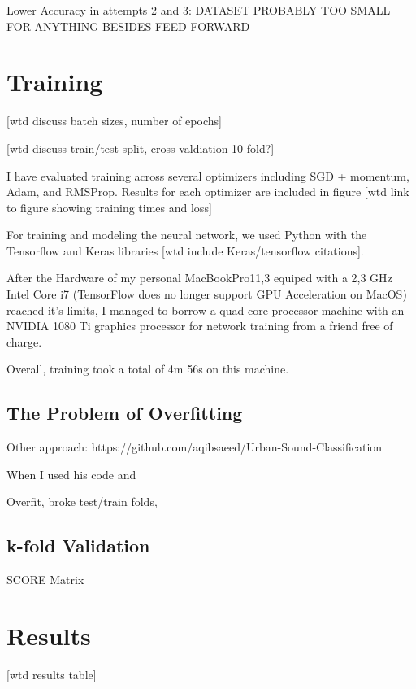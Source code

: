 Lower Accuracy in attempts 2 and 3: DATASET PROBABLY TOO SMALL FOR ANYTHING BESIDES FEED FORWARD


\newpage

\section{Training}

[wtd discuss batch sizes, number of epochs]

[wtd discuss train/test split, cross valdiation 10 fold?]

I have evaluated training across several optimizers including SGD + momentum, Adam, and RMSProp.  Results for each optimizer are included in figure [wtd link to figure showing training times and loss]

For training and modeling the neural network, we used Python with the Tensorflow and Keras libraries [wtd include Keras/tensorflow citations].

After the Hardware of my personal MacBookPro11,3 equiped with a 2,3 GHz Intel Core i7 (TensorFlow does no longer support GPU Acceleration on MacOS) reached it's limits, I managed to borrow a quad-core processor machine with an NVIDIA 1080 Ti graphics processor for network training from a friend free of charge.

Overall, training took a total of 4m 56s on this machine.

\subsection{The Problem of Overfitting}

Other approach: https://github.com/aqibsaeed/Urban-Sound-Classification

When I used his code and

Overfit, broke test/train folds, 

\newpage

\subsection{k-fold Validation}


SCORE Matrix


\newpage

\section{Results}

[wtd results table]

